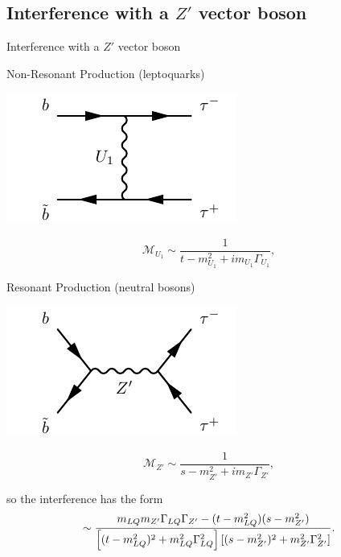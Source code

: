 \documentclass{../bredelebeamer}
\begin{document}
\subsection{Interference with a $Z'$ vector boson}
\begin{frame}{Interference with a $Z'$ vector boson}
\begin{minipage}{.48\linewidth}
	Non-Resonant Production (leptoquarks)
	\begin{center}
		\includegraphics[width=.9\linewidth,height=.5\linewidth]{non-res_vector.pdf}
	\end{center}
	\begin{equation}
		\mathcal{M}_{U_1} \sim \frac{1}{t-m_{U_1}^2 + i m_{U_1} \Gamma_{U_1}},
	\end{equation}
\end{minipage}
\hfill
\begin{minipage}{.48\linewidth}
	Resonant Production (neutral bosons)
	\begin{center}
		\includegraphics[width=.9\linewidth,height=.5\linewidth]{DY.pdf}
	\end{center}
	\begin{equation}
		\mathcal{M}_{Z'} \sim \frac{1}{s-m_{Z'}^2 + i m_{Z'} \Gamma_{Z'}},
	\end{equation}
\end{minipage}
so the interference has the form
		\begin{equation}\notag
				\sim \frac{ m_{LQ}m_{Z'}\Gamma_{LQ}\Gamma_{Z'}- (t-m_{LQ}^2)(s-m_{Z'}^2)}{\left[
						(t-m_{LQ}^2)^2 + m_{LQ}^2\Gamma_{LQ}^2
				\right]
				\left[
						(s-m_{Z'}^2)^2 + m_{Z'}^2\Gamma_{Z'}^2
				\right]}.
		\end{equation}
\end{frame}
\end{document}
